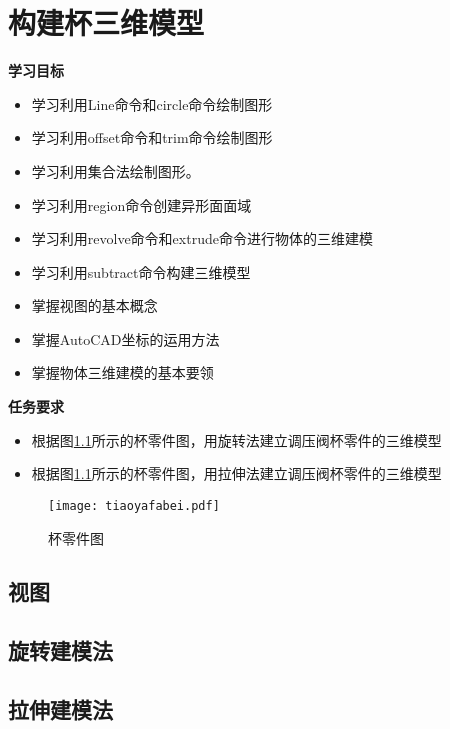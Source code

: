 \chapter{构建杯三维模型}\label{chap:bei}

{\bfseries 学习目标}
\begin{itemize}
\item 学习利用Line命令和circle命令绘制图形
\item 学习利用offset命令和trim命令绘制图形
\item 学习利用集合法绘制图形。
\item 学习利用region命令创建异形面面域
\item 学习利用revolve命令和extrude命令进行物体的三维建模
\item 学习利用subtract命令构建三维模型
\item 掌握视图的基本概念
\item 掌握AutoCAD坐标的运用方法
\item 掌握物体三维建模的基本要领
\end{itemize}

{\bfseries 任务要求}
\begin{itemize}
\item 根据图\ref{fig:tiaoyafabei}所示的杯零件图，用旋转法建立调压阀杯零件的三维模型
\item 根据图\ref{fig:tiaoyafabei}所示的杯零件图，用拉伸法建立调压阀杯零件的三维模型
\end{itemize}

\begin{figure}[htbp]
\centering
\texttt{[image: tiaoyafabei.pdf]}
\caption{杯零件图}\label{fig:tiaoyafabei}
\end{figure}
\clearpage
\section{视图}



\section{旋转建模法}


\section{拉伸建模法}


\endinput